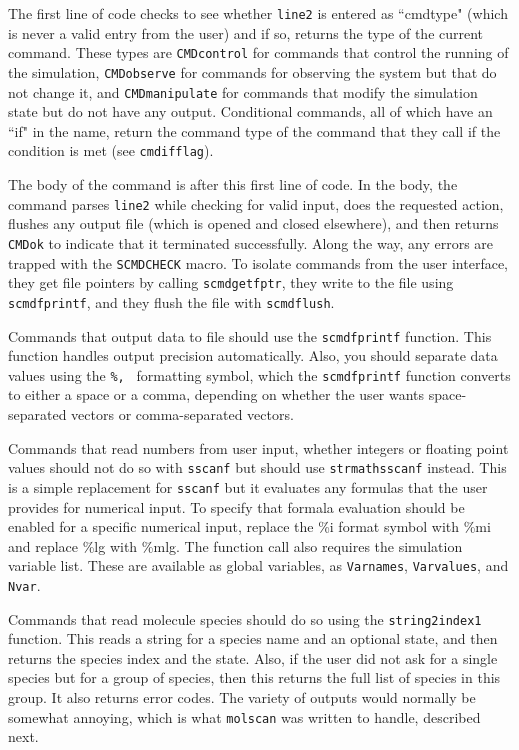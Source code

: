 \documentclass {scrbook}
\newcommand {\ttt} {\texttt}
\begin{document}
The first line of code checks to see whether \ttt{line2} is entered as ``cmdtype" (which is never a valid entry from the user) and if so, returns the type of the current command. These types are \ttt{CMDcontrol} for commands that control the running of the simulation, \ttt{CMDobserve} for commands for observing the system but that do not change it, and \ttt{CMDmanipulate} for commands that modify the simulation state but do not have any output. Conditional commands, all of which have an ``if" in the name, return the command type of the command that they call if the condition is met (see \ttt{cmdifflag}).

The body of the command is after this first line of code. In the body, the command parses \ttt{line2} while checking for valid input, does the requested action, flushes any output file (which is opened and closed elsewhere), and then returns \ttt{CMDok} to indicate that it terminated successfully. Along the way, any errors are trapped with the \ttt{SCMDCHECK} macro. To isolate commands from the user interface, they get file pointers by calling \ttt{scmdgetfptr}, they write to the file using \ttt{scmdfprintf}, and they flush the file with \ttt{scmdflush}.

Commands that output data to file should use the \ttt{scmdfprintf} function. This function handles output precision automatically. Also, you should separate data values using the \ttt{\%, } formatting symbol, which the \ttt{scmdfprintf} function converts to either a space or a comma, depending on whether the user wants space-separated vectors or comma-separated vectors.

Commands that read numbers from user input, whether integers or floating point values should not do so with \ttt{sscanf} but should use \ttt{strmathsscanf} instead. This is a simple replacement for \ttt{sscanf} but it evaluates any formulas that the user provides for numerical input. To specify that formala evaluation should be enabled for a specific numerical input, replace the \%i format symbol with \%mi and replace \%lg with \%mlg. The function call also requires the simulation variable list. These are available as global variables, as \ttt{Varnames}, \ttt{Varvalues}, and \ttt{Nvar}.

Commands that read molecule species should do so using the \ttt{string2index1} function. This reads a string for a species name and an optional state, and then returns the species index and the state. Also, if the user did not ask for a single species but for a group of species, then this returns the full list of species in this group. It also returns error codes. The variety of outputs would normally be somewhat annoying, which is what \ttt{molscan} was written to handle, described next.
\end{document}
